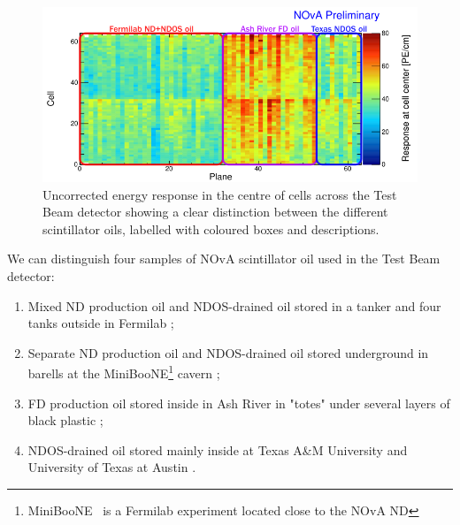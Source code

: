 
\begin{figure}[!ht]
\centering
\includegraphics[width=\textwidth]{Plots/TBCalibration/TestBeamScintillatorOils.png}
\caption{Uncorrected energy response in the centre of cells across the Test Beam detector showing a clear distinction between the different scintillator oils, labelled with coloured boxes and descriptions.}
\label{fig:Scintillators}
\end{figure}

We can distinguish four samples of \gls{NOvA} scintillator oil used in the Test Beam detector:
\begin{enumerate}
\item Mixed \gls{ND} production oil and \gls{NDOS}-drained oil stored in a tanker and four tanks outside in \gls{Fermilab} \cite{NOvA-doc-38349};
\item Separate \gls{ND} production oil and \gls{NDOS}-drained oil stored underground in barells at the MiniBooNE\footnote{MiniBooNE~\cite{MiniBooNEWebsite} is a \gls{Fermilab} experiment located close to the \gls{NOvA} \gls{ND}} cavern \cite{NOvA-doc-33012};
\item \gls{FD} production oil stored inside in Ash River in "totes" under several layers of black plastic \cite{NOvA-doc-34067};
\item \gls{NDOS}-drained oil stored mainly inside at Texas A\&M University and University of Texas at Austin \cite{NOvA-doc-38740, NOvA-doc-39088}.
\end{enumerate}


